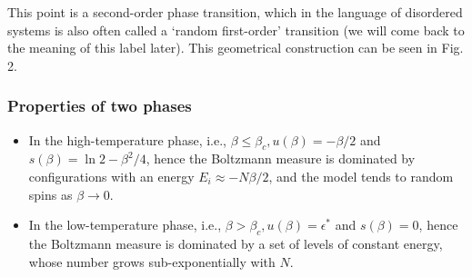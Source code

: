 \documentclass[letterpaper,english,10pt]{article}
\begin{document}
This point is a second-order phase transition, which in the language of disordered systems is also often called a `random first-order' transition (we will come back to the meaning of this label later). 
This geometrical construction can be seen in Fig. 2.

\subsubsection{Properties of two phases}
\begin{itemize}
\item In the high-temperature phase, i.e., $\beta \le \beta_c, u(\beta) = -\beta/2$ and $s(\beta) = \ln2- \beta^2/4$, 
hence the Boltzmann measure is dominated by configurations with an energy $E_i \approx -N\beta/2$, 
and the model tends to random spins as $\beta \to 0$. 

\item In the low-temperature phase, i.e., $\beta > \beta_c, u(\beta) = \epsilon^\ast$ and $s(\beta) = 0$, hence the Boltzmann measure is dominated by a set of levels of constant energy, whose number grows sub-exponentially with $N$. 
\end{itemize}
\end{document}
